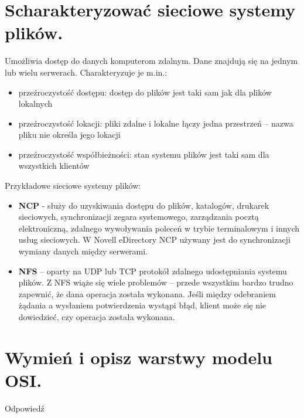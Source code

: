 \documentclass[12pt,a4paper]{article}
\begin{document}
	\section{Scharakteryzować sieciowe systemy plików.}
	\label{sec:siecsysplik}
	Umożliwia dostęp do danych komputerom zdalnym. Dane znajdują się na jednym lub wielu serwerach. Charakteryzuje je m.in.:
	\begin{itemize}
		\item przeźroczystość dostępu: dostęp do plików jest taki sam jak dla plików lokalnych
		\item przeźroczystość lokacji: pliki zdalne i lokalne łączy jedna przestrzeń -- nazwa pliku nie określa jego lokacji
		\item przeźroczystość współbieżności: stan systemu plików jest taki sam dla wszystkich klientów
	\end{itemize}

	Przykładowe sieciowe systemy plików:
	\begin{itemize}
		\item \textbf{NCP} - służy do uzyskiwania dostępu do plików, katalogów, drukarek sieciowych, synchronizacji zegara systemowego, zarządzania pocztą elektroniczną, zdalnego wywoływania poleceń w trybie terminalowym i innych usług sieciowych. W Novell eDirectory NCP używany jest do synchronizacji wymiany danych między serwerami.
		\item \textbf{NFS} – oparty na UDP lub TCP protokół zdalnego udostępniania systemu plików. Z NFS wiąże się wiele problemów – przede wszystkim bardzo trudno zapewnić, że dana operacja została wykonana. Jeśli między odebraniem żądania a wysłaniem potwierdzenia wystąpi błąd, klient może się nie dowiedzieć, czy operacja została wykonana.
	\end{itemize}

	\section{Wymień i opisz warstwy modelu OSI.}
	Odpowiedź
\end{document}
